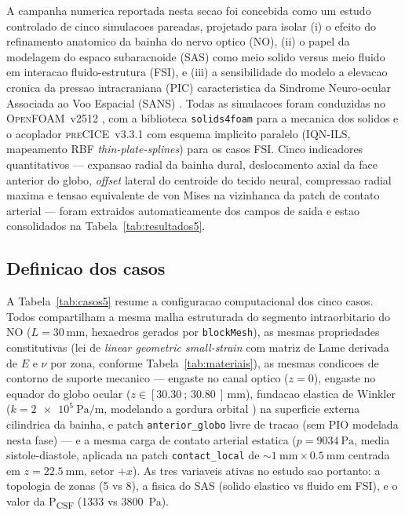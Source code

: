 A campanha numerica reportada nesta secao foi concebida como um estudo controlado de cinco simulacoes pareadas, projetado para isolar (i) o efeito do refinamento anatomico da bainha do nervo optico (NO), (ii) o papel da modelagem do espaco subaracnoide (SAS) como meio solido versus meio fluido em interacao fluido-estrutura (FSI), e (iii) a sensibilidade do modelo a elevacao cronica da pressao intracraniana (PIC) caracteristica da Sindrome Neuro-ocular Associada ao Voo Espacial (SANS) \citep{Lee2020NPJ, Mader2011}. Todas as simulacoes foram conduzidas no \textsc{OpenFOAM}~v2512 \citep{Jasak1996}, com a biblioteca \texttt{solids4foam} \citep{Cardiff2018s4f} para a mecanica dos solidos e o acoplador \textsc{preCICE}~v3.3.1 \citep{Chourdakis2022, Bungartz2016} com esquema implicito paralelo (IQN-ILS, mapeamento RBF \emph{thin-plate-splines}) para os casos FSI. Cinco indicadores quantitativos --- expansao radial da bainha dural, deslocamento axial da face anterior do globo, \emph{offset} lateral do centroide do tecido neural, compressao radial maxima e tensao equivalente de von Mises na vizinhanca da patch de contato arterial --- foram extraidos automaticamente dos campos de saida e estao consolidados na Tabela~\ref{tab:resultados5}.

\subsection{Definicao dos casos}
\label{sec:resultados-casos}

A Tabela~\ref{tab:casos5} resume a configuracao computacional dos cinco casos. Todos compartilham a mesma malha estruturada do segmento intraorbitario do NO ($L = \SI{30}{\milli\meter}$, hexaedros gerados por \texttt{blockMesh}), as mesmas propriedades constitutivas (lei de \emph{linear geometric small-strain} com matriz de Lame derivada de $E$ e $\nu$ por zona, conforme Tabela~\ref{tab:materiais}), as mesmas condicoes de contorno de suporte mecanico --- engaste no canal optico ($z = 0$), engaste no equador do globo ocular ($z \in [\SI{30.30}{};\, \SI{30.80}{}]\,\si{\milli\meter}$), fundacao elastica de Winkler ($k = \SI{2e5}{\pascal\per\meter}$, modelando a gordura orbital \citep{Schoemaker2006}) na superficie externa cilindrica da bainha, e patch \texttt{anterior\_globo} livre de tracao (sem PIO modelada nesta fase) --- e a mesma carga de contato arterial estatica ($p = \SI{9034}{\pascal}$, media sistole-diastole, aplicada na patch \texttt{contact\_local} de $\sim \SI{1}{\milli\meter} \times \SI{0.5}{\milli\meter}$ centrada em $z = \SI{22.5}{\milli\meter}$, setor $+x$). As tres variaveis ativas no estudo sao portanto: a topologia de zonas (5 vs 8), a fisica do SAS (solido elastico vs fluido em FSI), e o valor da P\textsubscript{CSF} (\SI{1333}{} vs \SI{3800}{\pascal}).

